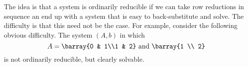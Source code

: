 The idea is that a system is ordinarily reducible if we can take row reductions in sequence an end up with a system that is easy to back-substitute and solve.
The difficulty is that this need not be the case.
For example, consider the following obvious difficulty.
The system $(A, b)$ in which
\[
	A = \barray{0 & 1\\1 & 2} \text{ and } \barray{1 \\ 2}
\]
is not ordinarily reducible, but clearly solvable.